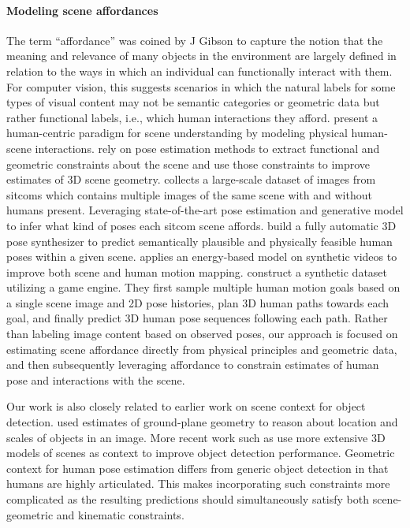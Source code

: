 \documentclass[times,referee,twocolumn,final,authoryear]{elsarticle}
\begin{document}
\paragraph{Modeling scene affordances} 
The term ``affordance'' was coined by J Gibson
\citep{gibson} to capture the notion that the meaning and relevance of many
objects in the environment are largely defined in relation to the ways in which
an individual can functionally interact with them. For computer vision, this
suggests scenarios in which the natural labels for some types of visual content
may not be semantic categories or geometric data but rather functional labels, i.e., 
which human interactions they afford.  \cite{Guptaafford} present a human-centric 
paradigm for scene understanding by modeling physical human-scene interactions.
\cite{Fouhey12} rely on pose estimation methods to extract functional and
geometric constraints about the scene and use those constraints to improve
estimates of 3D scene geometry.  \cite{Wang_affordanceCVPR2017} collects a
large-scale dataset of images from sitcoms which contains multiple images 
of the same scene with and without humans present. Leveraging state-of-the-art 
pose estimation and generative model to infer what kind of poses 
each sitcom scene affords.  \cite{xueting} build a  fully  automatic  3D  pose  
synthesizer to predict semantically plausible and physically feasible human poses 
within a given scene.  \cite{iMapper} applies an energy-based model on synthetic 
videos to improve both scene and human motion mapping. 
\cite{caoHMP2020} construct a synthetic dataset utilizing a game engine.  They first sample multiple human motion goals based on a single scene image and 2D pose histories, plan 3D human paths towards each goal, and finally predict 3D human pose sequences following each path.
Rather than labeling image 
content based on observed poses, our approach is focused on estimating 
scene affordance directly from physical principles and geometric data, and then
subsequently leveraging affordance to constrain estimates of human pose and 
interactions with the scene.  




Our work is also closely related to earlier work on scene context for object
detection.  \cite{Hoiem05,Hoiem06} used estimates of ground-plane geometry to reason
about location and scales of objects in an image. More recent work such as
\cite{Wang_2015_CVPR,diaz2016lifting,Matzen13} use more extensive 3D models of scenes 
as context to improve object detection performance.  Geometric context for human pose 
estimation differs from generic object detection in that humans are highly articulated. 
This makes incorporating such constraints more complicated as the resulting predictions 
should simultaneously satisfy both scene-geometric and kinematic constraints. 
\end{document}
